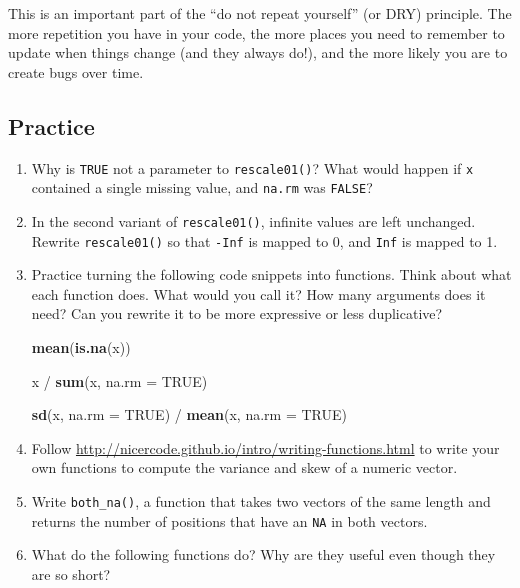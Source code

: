 \documentclass[]{book}
\newenvironment{Shaded}{\begin{snugshade}}{\end{snugshade}}
\newcommand{\KeywordTok}[1]{\textcolor[rgb]{0.13,0.29,0.53}{\textbf{{#1}}}}
\newcommand{\DataTypeTok}[1]{\textcolor[rgb]{0.13,0.29,0.53}{{#1}}}
\newcommand{\StringTok}[1]{\textcolor[rgb]{0.31,0.60,0.02}{{#1}}}
\newcommand{\OtherTok}[1]{\textcolor[rgb]{0.56,0.35,0.01}{{#1}}}
\newcommand{\NormalTok}[1]{{#1}}
\begin{document}
This is an important part of the ``do not repeat yourself'' (or DRY)
principle. The more repetition you have in your code, the more places
you need to remember to update when things change (and they always do!),
and the more likely you are to create bugs over time.

\subsection{Practice}\label{practice-2}

\begin{enumerate}
\def\labelenumi{\arabic{enumi}.}
\item
  Why is \texttt{TRUE} not a parameter to \texttt{rescale01()}? What
  would happen if \texttt{x} contained a single missing value, and
  \texttt{na.rm} was \texttt{FALSE}?
\item
  In the second variant of \texttt{rescale01()}, infinite values are
  left unchanged. Rewrite \texttt{rescale01()} so that \texttt{-Inf} is
  mapped to 0, and \texttt{Inf} is mapped to 1.
\item
  Practice turning the following code snippets into functions. Think
  about what each function does. What would you call it? How many
  arguments does it need? Can you rewrite it to be more expressive or
  less duplicative?

\begin{Shaded}
\begin{Highlighting}[]
\KeywordTok{mean}\NormalTok{(}\KeywordTok{is.na}\NormalTok{(x))}

\NormalTok{x /}\StringTok{ }\KeywordTok{sum}\NormalTok{(x, }\DataTypeTok{na.rm =} \OtherTok{TRUE}\NormalTok{)}

\KeywordTok{sd}\NormalTok{(x, }\DataTypeTok{na.rm =} \OtherTok{TRUE}\NormalTok{) /}\StringTok{ }\KeywordTok{mean}\NormalTok{(x, }\DataTypeTok{na.rm =} \OtherTok{TRUE}\NormalTok{)}
\end{Highlighting}
\end{Shaded}
\item
  Follow \url{http://nicercode.github.io/intro/writing-functions.html}
  to write your own functions to compute the variance and skew of a
  numeric vector.
\item
  Write \texttt{both\_na()}, a function that takes two vectors of the
  same length and returns the number of positions that have an
  \texttt{NA} in both vectors.
\item
  What do the following functions do? Why are they useful even though
  they are so short?


\end{enumerate}
\end{document}
